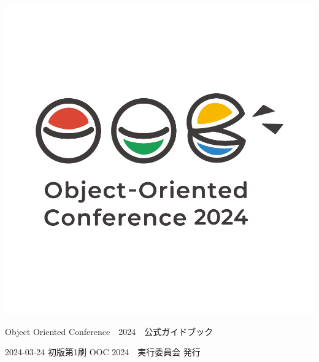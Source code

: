 \clearpage{\thispagestyle{empty}}
\begin{center}

\includegraphics[width=0.75\linewidth]{images/chap-title/ooc-logo.png}
\vspace{80pt}

\begin{sffamily}
\Large
Object Oriented Conference　2024　公式ガイドブック
\normalsize
\end{sffamily}
\vspace{320pt}

\begin{sffamily}
2024-03-24
\hspace{5pt}
初版第1刷
\hspace{5pt}
OOC 2024　実行委員会
\hspace{5pt}
発行
\end{sffamily}

\end{center}
